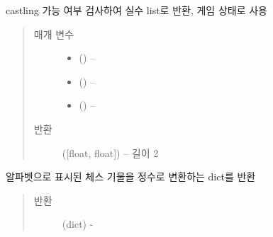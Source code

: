 \documentclass[letterpaper,10pt,english]{sphinxmanual}
\begin{document}

\begin{fulllineitems}
\label{\detokenize{agents.self_learning:agents.self_learning.utils.is_castling}}
castling 가능 여부 검사하여 실수 list로 반환, 게임 상태로 사용
\begin{quote}\begin{description}
\item[{매개 변수}] \leavevmode\begin{itemize}
\item {} 
 ({\hyperref[\detokenize{scripts:scripts.run_game.State}]{}}) -- 

\item {} 
 () -- 

\item {} 
 () -- 

\end{itemize}

\item[{반환}] \leavevmode
({[}float, float{]}) -- 길이 2

\end{description}\end{quote}

\end{fulllineitems}


\begin{fulllineitems}
\label{\detokenize{agents.self_learning:agents.self_learning.utils.make_piece_index}}
알파벳으로 표시된 체스 기물을 정수로 변환하는 dict를 반환
\begin{quote}\begin{description}
\item[{반환}] \leavevmode
(dict) -

\end{description}\end{quote}

\end{fulllineitems}
\end{document}

